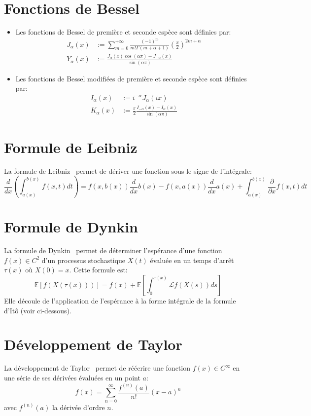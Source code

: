 \section*{Fonctions de Bessel}
\begin{itemize}
    \item Les fonctions de Bessel de première et seconde espèce sont définies par:
    \[
    \begin{aligned}
        J_\alpha(x)&:=\sum_{m=0}^{+\infty}\frac{{(-1)}^m}{m!\Gamma(m+\alpha+1)}{\left(\frac{x}{2}\right)}^{2m+\alpha} \\
        Y_\alpha(x)&:=\frac{J_\alpha(x)\cos(\alpha\pi)-J_{-\alpha}(x)}{\sin(\alpha\pi)}
    \end{aligned}
    \]
    \item Les fonctions de Bessel modifiées de première et seconde espèce sont définies par:
    \[
    \begin{aligned}
        I_\alpha(x)&:=i^{-\alpha}J_\alpha(ix)\\
        K_\alpha(x)&:=\frac{\pi}{2}\frac{I_{-\alpha}(x)-I_\alpha(x)}{\sin(\alpha\pi)}
    \end{aligned}
    \]
\end{itemize}

\label{special_formulas}

\section*{Formule de Leibniz}
La formule de Leibniz~\cite{abramowitz1964} permet de dériver une fonction sous le signe de l'intégrale:
\[
\frac{d}{dx}\left(\int_{a(x)}^{b(x)}f(x,t)dt\right)=f(x,b(x))\frac{d}{dx}b(x)-f(x,a(x))\frac{d}{dx}a(x)+\int_{a(x)}^{b(x)}\frac{\partial}{\partial x}f(x,t)dt
\]

\section*{Formule de Dynkin}
La formule de Dynkin~\cite{dynkin1965} permet de déterminer l'espérance d'une fonction \(f(x)\in C^2\) d'un processus stochastique \(X(t)\) évaluée en un temps d'arrêt \(\tau(x)\) où \(X(0)=x\). Cette formule est:
\[
\mathds{E}[f(X(\tau(x)))]=f(x)+\mathds{E}\left[\int_0^{\tau(x)}\mathcal{L}f(X(s))ds\right]
\]
Elle découle de l'application de l'espérance à la forme intégrale de la formule d'Itô (voir ci-dessous).

\section*{Développement de Taylor}
La développement de Taylor~\cite{banner2007} permet de réécrire une fonction \(f(x)\in C^\infty\) en une série de ses dérivées évaluées en un point \(a\):
\[
f(x)=\sum_{n=0}^\infty\frac{f^{(n)}(a)}{n!}{(x-a)}^n
\]
avec \(f^{(n)}(a)\) la dérivée d'ordre $n$.

